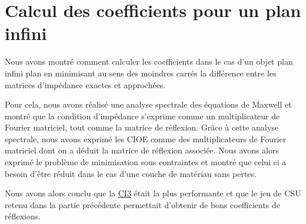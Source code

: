\chapter{Calcul des coefficients pour un plan infini}
\label{sec:plan}
\minitoc
\newpage
{}






Nous avons montré comment calculer les coefficients dans le cas d'un objet plan infini plan en minimisant au sens des moindres carrés la différence entre les matrices d'impédance exactes et approchées. 

Pour cela, nous avons réalisé une analyse spectrale des équations de Maxwell et montré que la condition d'impédance s'exprime comme un multiplicateur de Fourier matriciel, tout comme la matrice de réflexion. Grâce à cette analyse spectrale, nous avons exprimé les CIOE comme des multiplicateurs de Fourier matriciel dont on a déduit la matrice de réflexion associée. Nous avons alors exprimé le problème de minimisation sous contraintes et montré que celui ci a besoin d'être réduit dans le cas d'une couche de matériau sans pertes.

Nous avons alors conclu que la \hyperlink{ci3}{CI3} était la plus performante et que le jeu de CSU retenu dans la partie précédente permettait d'obtenir de bons coefficients de réflexions.
